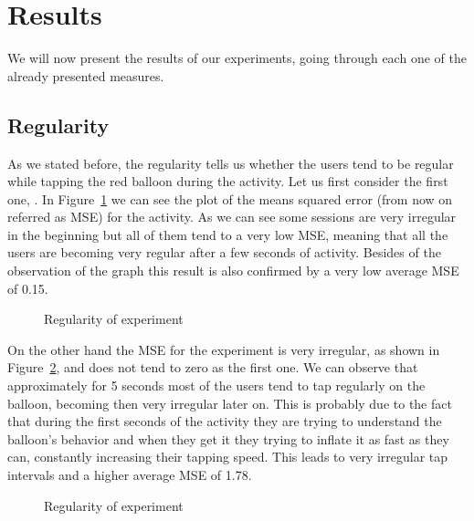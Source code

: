 \section{Results}
We will now present the results of our experiments, going through each one of the already presented measures.

\subsection{Regularity}
As we stated before, the regularity tells us whether the users tend to be regular while tapping the red balloon during the activity. Let us first consider the first one, \testfirst. In Figure~\ref{fig:reg1} we can see the plot of the means squared error (from now on referred as MSE) for the activity. As we can see some sessions are very irregular in the beginning but all of them tend to a very low MSE, meaning that all the users are becoming very regular after a few seconds of activity. Besides of the observation of the graph this result is also confirmed by a very low average MSE of 0.15.

\begin{figure}[h!t]
\centering
	{\setlength{\fboxsep}{1.5pt}
	 }
\caption{Regularity of \testfirst experiment}
\label{fig:reg1}
\end{figure}

On the other hand the MSE for the \testsecond experiment is very irregular, as shown in Figure~\ref{fig:reg2}, and does not tend to zero as the first one. We can observe that approximately for 5 seconds most of the users tend to tap regularly on the balloon, becoming then very irregular later on. This is probably due to the fact that during the first seconds of the activity they are trying to understand the balloon's behavior and when they get it they trying to inflate it as fast as they can, constantly increasing their tapping speed. This leads to very irregular tap intervals and a higher average MSE of 1.78.

\begin{figure}[h!t]
\centering
	{\setlength{\fboxsep}{1.5pt}
	 }
\caption{Regularity of \testsecond experiment}
\label{fig:reg2}
\end{figure}

